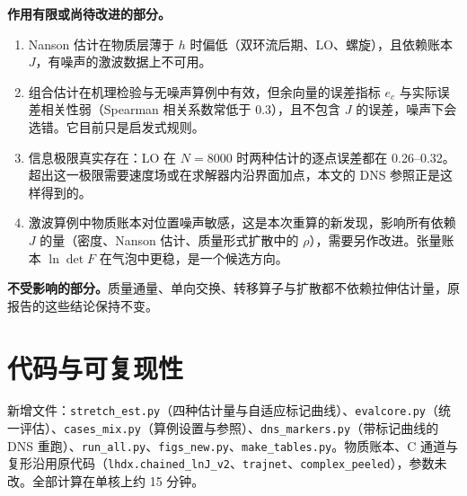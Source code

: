 \documentclass[10.5pt,a4paper]{article}
\theoremstyle{plain}
\begin{document}
\textbf{作用有限或尚待改进的部分。}
\begin{enumerate}
\item Nanson 估计在物质层薄于 $h$ 时偏低（双环流后期、LO、螺旋），且依赖账本 $J$，有噪声的激波数据上不可用。
\item 组合估计在机理检验与无噪声算例中有效，但余向量的误差指标 $e_c$ 与实际误差相关性弱（Spearman 相关系数常低于 0.3），且不包含 $J$ 的误差，噪声下会选错。它目前只是启发式规则。
\item 信息极限真实存在：LO 在 $N=8000$ 时两种估计的逐点误差都在 0.26–0.32。超出这一极限需要速度场或在求解器内沿界面加点，本文的 DNS 参照正是这样得到的。
\item 激波算例中物质账本对位置噪声敏感，这是本次重算的新发现，影响所有依赖 $J$ 的量（密度、Nanson 估计、质量形式扩散中的 $\rho$），需要另作改进。张量账本 $\ln\det F$ 在气泡中更稳，是一个候选方向。
\end{enumerate}

\textbf{不受影响的部分。}质量通量、单向交换、转移算子与扩散都不依赖拉伸估计量，原报告的这些结论保持不变。

\appendix
\section{代码与可复现性}
\sloppy 新增文件：\texttt{stretch\_est.py}（四种估计量与自适应标记曲线）、\texttt{evalcore.py}（统一评估）、\texttt{cases\_mix.py}（算例设置与参照）、\texttt{dns\_markers.py}（带标记曲线的 DNS 重跑）、\texttt{run\_all.py}、\texttt{figs\_new.py}、\texttt{make\_tables.py}。物质账本、C 通道与复形沿用原代码（\texttt{lhdx.chained\_lnJ\_v2}、\texttt{trajnet}、\texttt{complex\_peeled}），参数未改。全部计算在单核上约 15 分钟。
\end{document}
